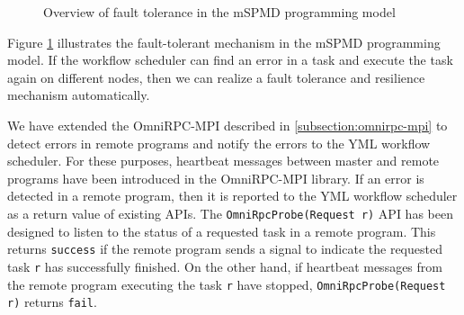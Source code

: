 \documentclass[graybox]{svmult}
\begin{document}
\begin{figure}[t]
 \begin{center}
\caption{Overview of fault tolerance in the mSPMD programming model}
\label{fig:overview-ft}
 \end{center}
\end{figure}

Figure \ref{fig:overview-ft} illustrates the fault-tolerant mechanism in the mSPMD programming model. If the workflow scheduler can find an error in a task and execute the task again on different nodes, then we can realize a fault tolerance and resilience mechanism automatically. 

We have extended the OmniRPC-MPI described in \ref{subsection:omnirpc-mpi} to detect errors in remote programs and notify the errors to the YML workflow scheduler. For these purposes, heartbeat messages between master and remote programs have been introduced in the OmniRPC-MPI library. 
If an error is detected in a remote program, then it is reported to the YML workflow scheduler as a return value of existing APIs. 
The {\tt OmniRpcProbe(Request r)} API has been designed to listen to the status of a requested task in a remote program. This returns {\tt success} if the remote program sends a signal to indicate the requested task {\tt r} has successfully finished. 
On the other hand, if heartbeat messages from the remote program executing the task {\tt r} have stopped, {\tt OmniRpcProbe(Request r)} returns {\tt fail}.
\end{document}
